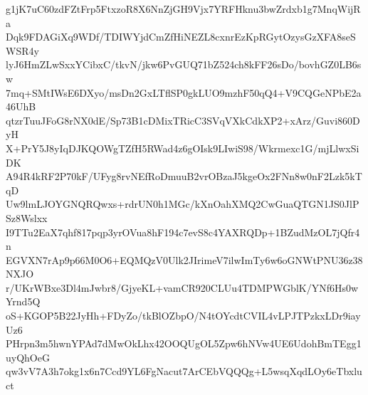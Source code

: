 g1jK7uC60zdFZtFrp5FtxzoR8X6NnZjGH9Vjx7YRFHknu3bwZrdxb1g7MnqWijRa
Dqk9FDAGiXq9WDf/TDIWYjdCmZfHiNEZL8cxnrEzKpRGytOzysGzXFA8seSWSR4y
lyJ6HmZLwSxxYCibxC/tkvN/jkw6PvGUQ71bZ524ch8kFF26sDo/bovhGZ0LB6sw
7mq+SMtIWsE6DXyo/msDn2GxLTflSP0gkLUO9mzhF50qQ4+V9CQGeNPbE2a46UhB
qtzrTuuJFoG8rNX0dE/Sp73B1cDMixTRicC3SVqVXkCdkXP2+xArz/Guvi860DyH
X+PrY5J8yIqDJKQOWgTZfH5RWad4z6gOIsk9LIwiS98/Wkrmexc1G/mjLlwxSiDK
A94R4kRF2P70kF/UFyg8rvNEfRoDmuuB2vrOBzaJ5kgeOx2FNn8w0nF2Lzk5kTqD
Uw9lmLJOYGNQRQwxs+rdrUN0h1MGc/kXnOahXMQ2CwGuaQTGN1JS0JlPSz8Wslxx
I9TTu2EaX7qhf817pqp3yrOVua8hF194c7evS8c4YAXRQDp+1BZudMzOL7jQfr4n
EGVXN7rAp9p66M0O6+EQMQzV0Ulk2JIrimeV7ilwImTy6w6oGNWtPNU36z38NXJO
r/UKrWBxe3Dl4mJwbr8/GjyeKL+vamCR920CLUu4TDMPWGblK/YNf6Hs0wYrnd5Q
oS+KGOP5B22JyHh+FDyZo/tkBlOZbpO/N4tOYcdtCVIL4vLPJTPzkxLDr9iayUz6
PHrpn3m5hwnYPAd7dMwOkLhx42OOQUgOL5Zpw6hNVw4UE6UdohBmTEgg1uyQhOeG
qw3vV7A3h7okg1x6n7Ccd9YL6FgNacut7ArCEbVQQQg+L5wsqXqdLOy6eTbxluct
